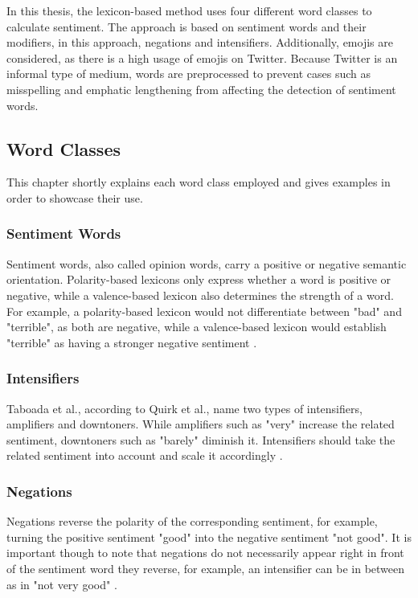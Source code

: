 In this thesis, the lexicon-based method uses four different word classes to calculate sentiment. The approach is based on sentiment words and their modifiers, in this approach, negations and intensifiers. Additionally, emojis are considered, as there is a high usage of emojis on Twitter. Because Twitter is an informal type of medium, words are preprocessed to prevent cases such as misspelling and emphatic lengthening from affecting the detection of sentiment words.

\subsection{Word Classes}
This chapter shortly explains each word class employed and gives examples in order to showcase their use.

\subsubsection{Sentiment Words}
Sentiment words, also called opinion words, carry a positive or negative semantic orientation. Polarity-based lexicons only express whether a word is positive or negative, while a valence-based lexicon also determines the strength of a word. For example, a polarity-based lexicon would not differentiate between "bad" and "terrible", as both are negative, while a valence-based lexicon would establish "terrible" as having a stronger negative sentiment \cite{DBLP:conf/icwsm/HuttoG14}.

\subsubsection{Intensifiers}
Taboada et al., according to Quirk et al., name two types of intensifiers, amplifiers and downtoners. While amplifiers such as "very" increase the related sentiment, downtoners such as "barely" diminish it. Intensifiers should take the related sentiment into account and scale it accordingly \cite{taboada}.

\subsubsection{Negations}
Negations reverse the polarity of the corresponding sentiment, for example, turning the positive sentiment "good" into the negative sentiment "not good". It is important though to note that negations do not necessarily appear right in front of the sentiment word they reverse, for example, an intensifier can be in between as in "not very good" \cite{taboada}.

